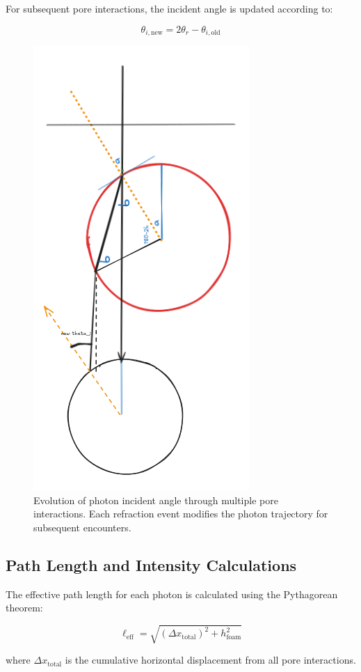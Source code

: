 \documentclass[twocolumn]{aastex701}
\begin{document}
For subsequent pore interactions, the incident angle is updated according to:

\begin{equation}
\theta_{i,\text{new}} = 2\theta_r - \theta_{i,\text{old}}
\end{equation}

\begin{figure}[t]
    \centering
    \includegraphics[width=0.45\linewidth]{incidenceangle.png}
    \caption{Evolution of photon incident angle through multiple pore interactions. Each refraction event modifies the photon trajectory for subsequent encounters.}
    \label{fig:incidenceangle}
\end{figure}

\subsection{Path Length and Intensity Calculations}

The effective path length for each photon is calculated using the Pythagorean theorem:

\begin{equation}
\ell_{\text{eff}} = \sqrt{(\Delta x_{\text{total}})^2 + h_{\text{foam}}^2}
\end{equation}

where $\Delta x_{\text{total}}$ is the cumulative horizontal displacement from all pore interactions.
\end{document}
